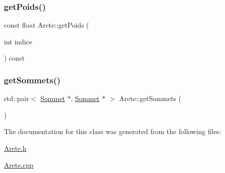 \mbox{\label{class_arete_a65ff1c3e69bae8336f85c4fc1c468f9b}} 
\subsubsection{\texorpdfstring{getPoids()}{getPoids()}}
{\footnotesize\ttfamily const float Arete\+::get\+Poids (\begin{DoxyParamCaption}\item[{int}]{indice }\end{DoxyParamCaption}) const}

\mbox{\label{class_arete_a92f3e0d045e6ec12c620944934bf9eab}} 
\subsubsection{\texorpdfstring{getSommets()}{getSommets()}}
{\footnotesize\ttfamily std\+::pair$<$ \mbox{\hyperlink{class_sommet}{Sommet}} $\ast$, \mbox{\hyperlink{class_sommet}{Sommet}} $\ast$ $>$ Arete\+::get\+Sommets (\begin{DoxyParamCaption}{ }\end{DoxyParamCaption})}



The documentation for this class was generated from the following files\+:\begin{DoxyCompactItemize}
\item 
\mbox{\hyperlink{_arete_8h}{Arete.\+h}}\item 
\mbox{\hyperlink{_arete_8cpp}{Arete.\+cpp}}\end{DoxyCompactItemize}
